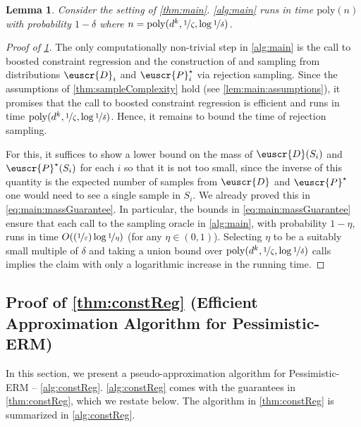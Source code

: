 \documentclass[11pt]{article}
\theoremstyle{plain}
\newtheorem{lemma}[theorem]{Lemma}
\theoremstyle{definition}
\theoremstyle{remark}
\newcommand{\nfrac}[2]{\nicefrac{#1}{#2}}
\newcommand{\poly}{\mathrm{poly}}
\newcommand{\eps}{\varepsilon}
\newcommand{\customcal}[1]{\euscr{#1}}
\newcommand{\cD}{\customcal{D}}
\newcommand{\cP}{\customcal{P}}
\newcommand{\pERM}{Pessimistic-ERM}
\newcommand{\cDgiven}{\cD}
\newcommand{\cPtrue}{\cP^\star}
\begin{document}
        \begin{lemma}\label{lem:main:rejectionSampling}
            Consider the setting of \cref{thm:main}. \cref{alg:main} runs in time $\poly(n)$ with probability $1-\delta$ where $n=\poly(d^k,\nfrac{1}{\zeta},\log{\nfrac{1}{\delta}})$.
        \end{lemma}
        \begin{proof}[Proof of \cref{lem:main:rejectionSampling}]
            The only computationally non-trivial step in \cref{alg:main} is the call to boosted constraint regression and the construction of and sampling from distributions $\cDgiven_i$ and $\cPtrue_i$ via rejection sampling.
            Since the assumptions of \cref{thm:sampleComplexity} hold (see \cref{lem:main:assumptions}), it promises that the call to boosted constraint regression is efficient and runs in time $\poly(d^k,\nfrac{1}{\zeta},\log{\nfrac{1}{\delta}})$. 
            Hence, it remains to bound the time of rejection sampling.
            
            For this, it suffices to show a lower bound on the mass of $\cD(S_i)$ and $\cPtrue(S_i)$ for each $i$ so that it is not too small, since the inverse of this quantity is the expected number of samples from $\cD$ and $\cPtrue$ one would need to see a single sample in $S_i$. 
            We already proved this in \cref{eq:main:massGuarantee}. 
            In particular, the bounds in \cref{eq:main:massGuarantee} ensure that each call to the sampling oracle in \cref{alg:main}, with probability $1-\eta$, runs in time $O((\nfrac{1}{\eps})\log{\nfrac{1}{\eta}})$ (for any $\eta\in(0,1)$). 
            Selecting $\eta$ to be a suitably small multiple of $\delta$ and taking a union bound over $\poly(d^k,\nfrac{1}{\zeta},\log{\nfrac{1}{\delta}})$ calls implies the claim with only a logarithmic increase in the running time.

        \end{proof}
        
        


         
    \subsection{Proof of \cref{thm:constReg} (Efficient Approximation Algorithm for \pERM{})}
        \label{sec:constReg}\label{sec:efficientPERM}
        In this section, we present a pseudo-approximation algorithm for \pERM{} -- \cref{alg:constReg}.
        \cref{alg:constReg} comes with the guarantees in \cref{thm:constReg}, which we restate below.
        \constReg*
        \noindent The algorithm in \cref{thm:constReg} is summarized in \cref{alg:constReg}.
\end{document}
